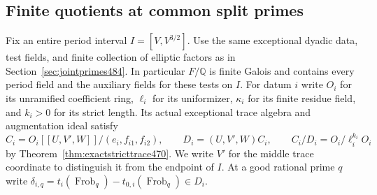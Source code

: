 \documentclass[a4paper,11pt]{article}
\theoremstyle{definition}
\theoremstyle{remark}
\numberwithin{equation}{section}
\begin{document}
\subsection{Finite quotients at common split primes}
\label{sec:artiniansplit490}

Fix an entire period interval \(I=[V,V^{3/2}]\). Use the same
exceptional dyadic data, test fields, and finite collection of
elliptic factors as in Section~\ref{sec:jointprimes484}. In particular
\(F/\mathbb Q\) is finite Galois and contains every period field
and the auxiliary fields for these tests on \(I\). For datum \(i\)
write \(O_i\) for its unramified coefficient ring, \(\ell_i\) for
its uniformizer, \(\kappa_i\) for its finite residue field, and
\(k_i>0\) for its strict length. Its actual exceptional trace
algebra and augmentation ideal satisfy
\[
 C_i=O_i[[U,V',W]]/(e_i,f_{i1},f_{i2}),\qquad
 D_i=(U,V',W)C_i,\qquad C_i/D_i=O_i/\ell_i^{k_i}O_i
\]
by Theorem~\ref{thm:exactstricttrace470}. We write \(V'\) for
the middle trace coordinate to distinguish it from the endpoint
of \(I\). At a good rational prime \(q\) write
\(\delta_{i,q}=t_i(\operatorname{Frob}_q)-
t_{0,i}(\operatorname{Frob}_q)\in D_i\).
\end{document}
